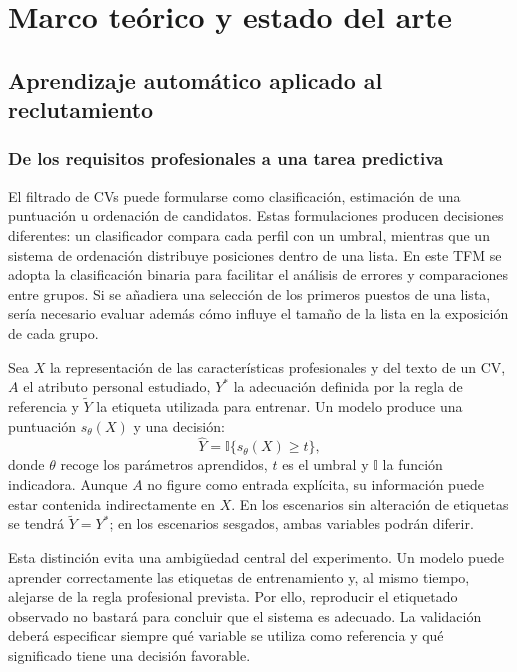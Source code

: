 \documentclass[11pt,a4paper,oneside]{report}
\begin{document}
\chapter{Marco teórico y estado del arte}
\label{cap:marco}

\section{Aprendizaje automático aplicado al reclutamiento}

\subsection{De los requisitos profesionales a una tarea predictiva}

El filtrado de CVs puede formularse como clasificación, estimación de una puntuación u ordenación de candidatos. Estas formulaciones producen decisiones diferentes: un clasificador compara cada perfil con un umbral, mientras que un sistema de ordenación distribuye posiciones dentro de una lista. En este TFM se adopta la clasificación binaria para facilitar el análisis de errores y comparaciones entre grupos. Si se añadiera una selección de los primeros puestos de una lista, sería necesario evaluar además cómo influye el tamaño de la lista en la exposición de cada grupo.

Sea $X$ la representación de las características profesionales y del texto de un CV, $A$ el atributo personal estudiado, $Y^{*}$ la adecuación definida por la regla de referencia y $\widetilde{Y}$ la etiqueta utilizada para entrenar. Un modelo produce una puntuación $s_{\theta}(X)$ y una decisión:
\begin{equation}
\widehat{Y}=\mathbb{I}\{s_{\theta}(X)\geq t\},
\end{equation}
donde $\theta$ recoge los parámetros aprendidos, $t$ es el umbral y $\mathbb{I}$ la función indicadora. Aunque $A$ no figure como entrada explícita, su información puede estar contenida indirectamente en $X$. En los escenarios sin alteración de etiquetas se tendrá $\widetilde{Y}=Y^{*}$; en los escenarios sesgados, ambas variables podrán diferir.

Esta distinción evita una ambigüedad central del experimento. Un modelo puede aprender correctamente las etiquetas de entrenamiento y, al mismo tiempo, alejarse de la regla profesional prevista. Por ello, reproducir el etiquetado observado no bastará para concluir que el sistema es adecuado. La validación deberá especificar siempre qué variable se utiliza como referencia y qué significado tiene una decisión favorable.
\end{document}
